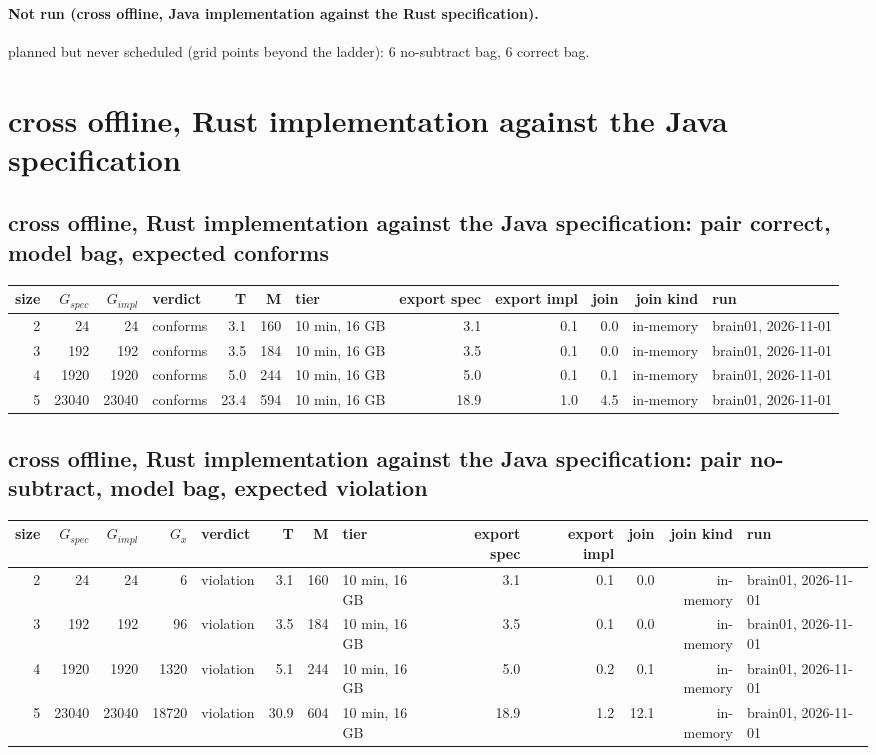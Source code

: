 \documentclass[10pt]{article}
\begin{document}
\paragraph{Not run (cross offline, Java implementation against the Rust specification).}
planned but never scheduled (grid points beyond the ladder): 6 no-subtract bag, 6 correct bag.\par
\section*{cross offline, Rust implementation against the Java specification}
\subsection*{cross offline, Rust implementation against the Java specification: pair \textsf{correct}, model bag, expected conforms}
\begin{longtable}{@{}rrrlrrlrrrrl@{}}
\toprule
size & $G_{\mathit{spec}}$ & $G_{\mathit{impl}}$ & verdict & T & M & tier & export spec & export impl & join & join kind & run \\
\midrule
\endhead
\color{red} 2 & 24 & 24 & conforms & 3.1 & 160 & 10 min, 16 GB & 3.1 & 0.1 & 0.0 & in-memory & brain01, 2026-11-01 \\
\color{red} 3 & 192 & 192 & conforms & 3.5 & 184 & 10 min, 16 GB & 3.5 & 0.1 & 0.0 & in-memory & brain01, 2026-11-01 \\
\color{red} 4 & 1920 & 1920 & conforms & 5.0 & 244 & 10 min, 16 GB & 5.0 & 0.1 & 0.1 & in-memory & brain01, 2026-11-01 \\
\color{red} 5 & 23040 & 23040 & conforms & 23.4 & 594 & 10 min, 16 GB & 18.9 & 1.0 & 4.5 & in-memory & brain01, 2026-11-01 \\
\bottomrule
\end{longtable}
\subsection*{cross offline, Rust implementation against the Java specification: pair \textsf{no-subtract}, model bag, expected violation}
\begin{longtable}{@{}rrrrlrrlrrrrl@{}}
\toprule
size & $G_{\mathit{spec}}$ & $G_{\mathit{impl}}$ & $G_x$ & verdict & T & M & tier & export spec & export impl & join & join kind & run \\
\midrule
\endhead
\color{red} 2 & 24 & 24 & 6 & violation & 3.1 & 160 & 10 min, 16 GB & 3.1 & 0.1 & 0.0 & in-memory & brain01, 2026-11-01 \\
\color{red} 3 & 192 & 192 & 96 & violation & 3.5 & 184 & 10 min, 16 GB & 3.5 & 0.1 & 0.0 & in-memory & brain01, 2026-11-01 \\
\color{red} 4 & 1920 & 1920 & 1320 & violation & 5.1 & 244 & 10 min, 16 GB & 5.0 & 0.2 & 0.1 & in-memory & brain01, 2026-11-01 \\
\color{red} 5 & 23040 & 23040 & 18720 & violation & 30.9 & 604 & 10 min, 16 GB & 18.9 & 1.2 & 12.1 & in-memory & brain01, 2026-11-01 \\
\bottomrule
\end{longtable}
\end{document}
